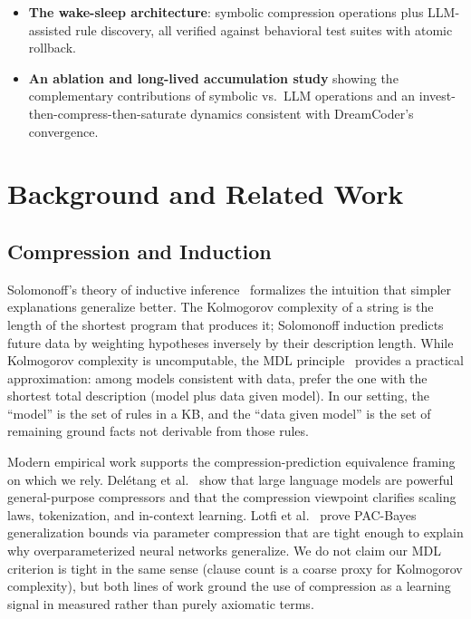 \documentclass[10pt,conference]{IEEEtran}
\begin{document}
\begin{itemize}
\item \textbf{The wake-sleep architecture}: symbolic compression operations plus LLM-assisted rule discovery, all verified against behavioral test suites with atomic rollback.
\item \textbf{An ablation and long-lived accumulation study} showing the complementary contributions of symbolic vs.\ LLM operations and an invest-then-compress-then-saturate dynamics consistent with DreamCoder's convergence.
\end{itemize}


\section{Background and Related Work}
\label{sec:related}

\subsection{Compression and Induction}

Solomonoff's theory of inductive inference~\cite{solomonoff1964formal} formalizes the intuition that simpler explanations generalize better. The Kolmogorov complexity of a string is the length of the shortest program that produces it; Solomonoff induction predicts future data by weighting hypotheses inversely by their description length. While Kolmogorov complexity is uncomputable, the MDL principle~\cite{rissanen1978modeling,grunwald2007minimum} provides a practical approximation: among models consistent with data, prefer the one with the shortest total description (model plus data given model). In our setting, the ``model'' is the set of rules in a KB, and the ``data given model'' is the set of remaining ground facts not derivable from those rules.

Modern empirical work supports the compression-prediction equivalence framing on which we rely. Del\'etang et al.~\cite{deletang2024language} show that large language models are powerful general-purpose compressors and that the compression viewpoint clarifies scaling laws, tokenization, and in-context learning. Lotfi et al.~\cite{lotfi2022pac} prove PAC-Bayes generalization bounds via parameter compression that are tight enough to explain why overparameterized neural networks generalize. We do not claim our MDL criterion is tight in the same sense (clause count is a coarse proxy for Kolmogorov complexity), but both lines of work ground the use of compression as a learning signal in measured rather than purely axiomatic terms.
\end{document}
